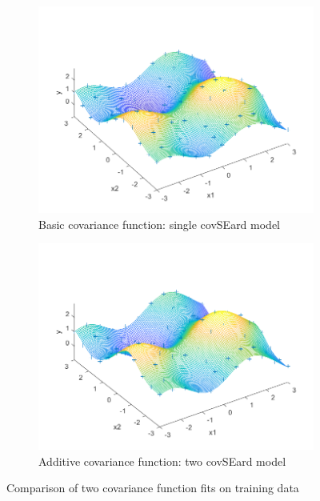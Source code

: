 \documentclass[]{article}
\begin{document}
\begin{figure}[!h]
	\begin{subfigure}{0.5\linewidth}
		\centering
		\includegraphics[width=\linewidth]{1e1}
		\caption{Basic covariance function: single covSEard model}
		\label{fig:1e1}
	\end{subfigure}
	\begin{subfigure}{0.5\linewidth}
		\centering
		\includegraphics[width=\linewidth]{1e2}
		\caption{Additive covariance function: two covSEard model}
		\label{fig:1e2}
	\end{subfigure}
	\caption{Comparison of two covariance function fits on training data}
	\label{fig:1e}
\end{figure}
\end{document}
